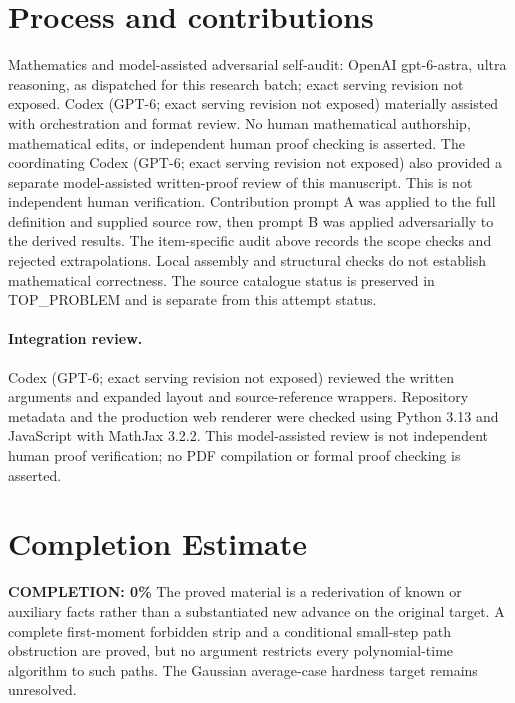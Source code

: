 \documentclass[11pt]{article}
\begin{document}
\section{Process and contributions}
Mathematics and model-assisted adversarial self-audit: OpenAI gpt-6-astra, ultra reasoning, as dispatched for this research batch; exact serving revision not exposed. Codex (GPT-6; exact serving revision not exposed) materially assisted with orchestration and format review. No human mathematical authorship, mathematical edits, or independent human proof checking is asserted.
The coordinating Codex (GPT-6; exact serving revision not exposed) also provided a separate model-assisted written-proof review of this manuscript. This is not independent human verification.
Contribution prompt A was applied to the full definition and supplied source row, then prompt B was applied adversarially to the derived results. The item-specific audit above records the scope checks and rejected extrapolations. Local assembly and structural checks do not establish mathematical correctness. The source catalogue status is preserved in TOP\_PROBLEM and is separate from this attempt status.
\paragraph{Integration review.} Codex (GPT-6; exact serving revision not exposed) reviewed the written arguments and expanded layout and source-reference wrappers. Repository metadata and the production web renderer were checked using Python 3.13 and JavaScript with MathJax 3.2.2. This model-assisted review is not independent human proof verification; no PDF compilation or formal proof checking is asserted.

\section{Completion Estimate}
\noindent\textbf{COMPLETION: 0\%}
The proved material is a rederivation of known or auxiliary facts rather than a substantiated new advance on the original target. A complete first-moment forbidden strip and a conditional small-step path obstruction are proved, but no argument restricts every polynomial-time algorithm to such paths. The Gaussian average-case hardness target remains unresolved.
\end{document}
